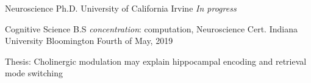 
\begin{cventries}
\cventry
    {Neuroscience Ph.D.} %
    {University of California Irvine} %
    {} %
    {\textit{In progress}} %
    {
      \begin{cvitems} %
	\item{ }
      \end{cvitems}
    }
  \cventry
    {Cognitive Science B.S \textit{concentration}: computation, Neuroscience Cert.} %
    {Indiana University Bloomington} %
    {} %
    {Fourth of May, 2019} %
    {
      \begin{cvitems} %
	\item{Thesis: Cholinergic modulation may explain hippocampal encoding and retrieval mode switching}
      \end{cvitems}
    }


\end{cventries}
